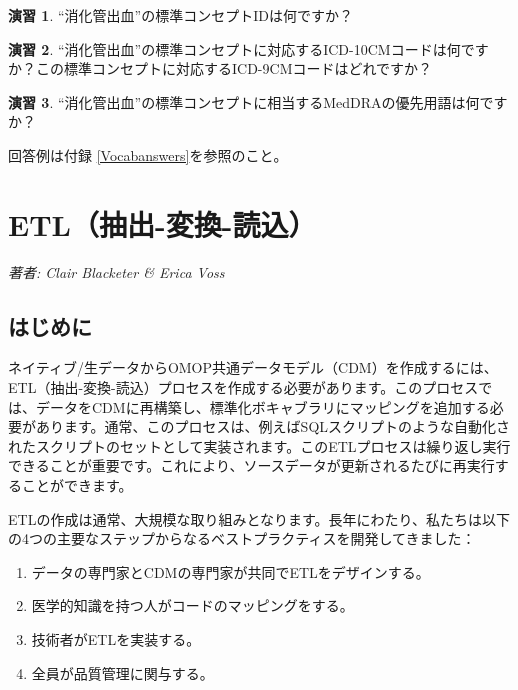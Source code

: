 \documentclass[
  11pt]{book}
\providecommand{\tightlist}{%
  \setlength{\itemsep}{0pt}\setlength{\parskip}{0pt}}
\theoremstyle{definition}
\theoremstyle{definition}
\theoremstyle{definition}
\newtheorem{exercise}{演習}[chapter]
\theoremstyle{definition}
\theoremstyle{remark}
\begin{document}
\begin{exercise}
\protect\hypertarget{exr:exerciseVocab1}{}\label{exr:exerciseVocab1}``消化管出血''の標準コンセプトIDは何ですか？
\end{exercise}

\begin{exercise}
\protect\hypertarget{exr:exerciseVocab2}{}\label{exr:exerciseVocab2}``消化管出血''の標準コンセプトに対応するICD-10CMコードは何ですか？この標準コンセプトに対応するICD-9CMコードはどれですか？
\end{exercise}

\begin{exercise}
\protect\hypertarget{exr:exerciseVocab3}{}\label{exr:exerciseVocab3}``消化管出血''の標準コンセプトに相当するMedDRAの優先用語は何ですか？
\end{exercise}

回答例は付録 \ref{Vocabanswers}を参照のこと。

\chapter{ETL（抽出-変換-読込）}\label{ExtractTransformLoad}

\emph{著者: Clair Blacketer \& Erica Voss}

\section{はじめに}\label{ux306fux3058ux3081ux306b}

ネイティブ/生データからOMOP共通データモデル（CDM）を作成するには、ETL（抽出-変換-読込）プロセスを作成する必要があります。このプロセスでは、データをCDMに再構築し、標準化ボキャブラリにマッピングを追加する必要があります。通常、このプロセスは、例えばSQLスクリプトのような自動化されたスクリプトのセットとして実装されます。このETLプロセスは繰り返し実行できることが重要です。これにより、ソースデータが更新されるたびに再実行することができます。   

ETLの作成は通常、大規模な取り組みとなります。長年にわたり、私たちは以下の4つの主要なステップからなるベストプラクティスを開発してきました：

\begin{enumerate}
\def\labelenumi{\arabic{enumi}.}
\tightlist
\item
  データの専門家とCDMの専門家が共同でETLをデザインする。
\item
  医学的知識を持つ人がコードのマッピングをする。
\item
  技術者がETLを実装する。
\item
  全員が品質管理に関与する。
\end{enumerate}
\end{document}
